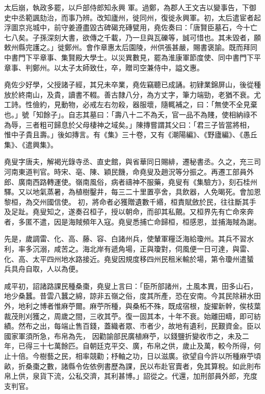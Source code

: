 \begin{pinyinscope}
 太后崩，執政多罷，以戶部侍郎知永興
 軍。過鄭，為郡人王文吉以變事告，下御史中丞範諷劾治，而事乃辨。改知廬州，徙同州，復徙永興軍。初，太后遣宦者起浮圖京兆城中，前守姜遵盡毀古碑碣充磚甓用，堯佐奏曰：「唐賢臣墓石，今十亡七八矣。子孫深刻大書，欲傳之千載，乃一旦與瓦礫等，誠可惜也。其未毀者，願敕州縣完護之。」徙鄭州。會作章惠太后園陵，州供張甚嚴，賜書褒諭。既而拜同中書門下平章事、集賢殿大學士。以災異數見，罷為淮康軍節度使、同中書門下平
 章事、判鄭州。以太子太師致仕，卒，贈司空兼侍中，謚文惠。



 堯佐少好學，父授諸子經，其兄未卒業，堯佐竊聽已成誦。初肄業錦屏山，後從種放於終南山，及貴，讀書不輟。善古隸八分，為方丈字，筆力端勁，老猶不衰。尤工詩。性儉約，見動物，必戒左右勿殺，器服壞，隨輒補之，曰：「無使不全見棄也。」號「知餘子」。自志其墓曰：「壽八十二不為夭，官一品不為賤，使相納祿不為辱，三者粗可歸息於父母棲神之域矣。」陳摶嘗謂其父曰：「君三子皆當將相，
 惟中子貴且壽。」後如摶言。有《集》三十卷，又有《潮陽編》、《野廬編》、《愚丘集》、《遣興集》。



 堯叟字唐夫，解褐光錄寺丞、直史館，與省華同日賜緋，遷秘書丞。久之，充三司河南東道判官。時宋、亳、陳、穎民饑，命堯叟及趙況等分振之。再遷工部員外郎、廣南西路轉運使。嶺南風俗，病者禱神不服藥，堯叟有《集驗方》，刻石桂州驛。又以地氣蒸暑，為植樹鑿井，每三二十里置亭舍，具飲器，人免暍死。會加恩黎桓，為交州國信使。
 初，將命者必獲贈遺數千緡，桓責賦斂於民，往往斷其手及足趾。堯叟知之，遂奏召桓子，授以朝命，而卻其私覿。又桓界先有亡命來奔者，多匿不遣，因是海賊頻年入寇。堯叟悉捕亡命歸桓，桓感恩，並捕海賊為謝。



 先是，歲調雷、化、高、藤、容、白諸州兵，使輦軍糧泛海給瓊州。其兵不習水利，率多沉溺，咸苦之。海北岸有遞角場，正與瓊對，伺風便一日可達，與雷、化、高、太平四州地水路接近。堯叟因規度移四州民租米輸於場，第令瓊州遣蜑
 兵具舟自取，人以為便。



 咸平初，詔諸路課民種桑棗，堯叟上言曰：「臣所部諸州，土風本異，田多山石，地少桑蠶。昔雲八蠶之綿，諒非五嶺之俗，度其所產，恐在安南。今其民除耕水田外，地利之博者惟麻苧爾。麻苧所種，與桑柘不殊，既成宿根，旋擢新幹，俟枝葉裁茂則刈獲之，周歲之間，三收其苧。復一固其本，十年不衰。始離田疇，即可紡績。然布之出，每端止售百錢，蓋織者眾、市者少，故地有遺利，民艱資金。臣以國家軍須所急，布帛為先，
 因勸諭部民廣植麻苧，以錢鹽折變收市之，未及二年，已得三十七萬餘匹。自朝廷克平交、廣，布帛之供，歲止及萬，較今所得，何止十倍。今樹藝之民，相率競勸；杼軸之功，日以滋廣。欲望自今許以所種麻苧頃畝，折桑棗之數，諸縣令佐依例書歷為課，民以布赴官賣者，免其算稅。如此則布帛上供，泉貨下流，公私交濟，其利甚博。」詔從之。代還，加刑部員外郎，充度支判官。




\end{pinyinscope}
